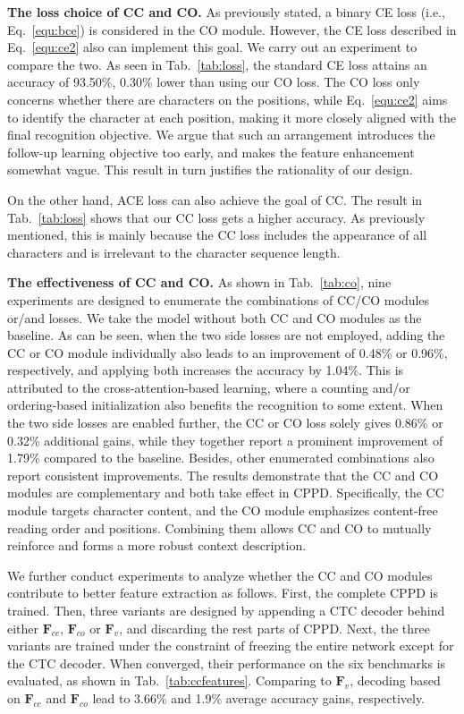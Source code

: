 \documentclass[10pt,journal,compsoc]{IEEEtran}
\begin{document}
\noindent\textbf{The loss choice of CC and CO.}
As previously stated, a binary CE loss (i.e., Eq.~\ref{equ:bce}) is considered in the CO module. However, the CE loss described in Eq.~\ref{equ:ce2} also can implement this goal. We carry out an experiment to compare the two. As seen in Tab.~\ref{tab:loss}, the standard CE loss attains an accuracy of 93.50\%, 0.30\% lower than using our CO loss. The CO loss only concerns whether there are characters on the positions, while Eq.~\ref{equ:ce2} aims to identify the character at each position, making it more closely aligned with the final recognition objective. We argue that such an arrangement introduces the follow-up learning objective too early, and makes the feature enhancement somewhat vague. This result in turn justifies the rationality of our design.

On the other hand, ACE loss \cite{xie2019aggregation} can also achieve the goal of CC. The result in Tab.~\ref{tab:loss} shows that our CC loss gets a higher accuracy. As previously mentioned, this is mainly because the CC loss includes the appearance of all characters and is irrelevant to the character sequence length. 


\noindent\textbf{The effectiveness of CC and CO.}
As shown in Tab.~\ref{tab:co}, nine experiments are designed to enumerate the combinations of CC/CO modules or/and losses. We take the model without both CC and CO modules as the baseline. As can be seen, when the two side losses are not employed, adding the CC or CO module individually also leads to an improvement of 0.48\% or 0.96\%, respectively, and applying both increases the accuracy by 1.04\%. This is attributed to the cross-attention-based learning, where a counting and/or ordering-based initialization also benefits the recognition to some extent. When the two side losses are enabled further, the CC or CO loss solely gives 0.86\% or 0.32\% additional gains, while they together report a prominent improvement of 1.79\% compared to the baseline. Besides, other enumerated combinations also report consistent improvements. The results demonstrate that the CC and CO modules are complementary and both take effect in CPPD. Specifically, the CC module targets character content, and the CO module emphasizes content-free reading order and positions. Combining them allows CC and CO to mutually reinforce and forms a more robust context description.


We further conduct experiments to analyze whether the CC and CO modules contribute to better feature extraction as follows. First, the complete CPPD is trained. Then, three variants are designed by appending a CTC decoder behind either $\mathbf{F}_{cc}$, $\mathbf{F}_{co}$ or $\mathbf{F}_{v}$, and discarding the rest parts of CPPD. Next, the three variants are trained under the constraint of freezing the entire network except for the CTC decoder. When converged, their performance on the six benchmarks is evaluated, as shown in Tab.~\ref{tab:ccfeatures}. Comparing to $\mathbf{F}_{v}$, decoding based on $\mathbf{F}_{cc}$ and $\mathbf{F}_{co}$ lead to 3.66\% and 1.9\% average accuracy gains, respectively. 
\end{document}
